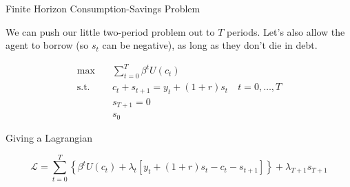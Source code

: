 \documentclass[11pt, xcolor={dvipsnames}, hyperref={colorlinks, allcolors=Blue}]{beamer}
\begin{document}
\begin{frame}{Finite Horizon Consumption-Savings Problem}

We can push our little two-period problem out to $T$ periods. Let's also allow the agent to borrow (so $s_{t}$ can be negative), as long as they don't die in debt.


\begin{align*}
\max \quad & \sum_{t=0}^{T} \beta^{t} U(c_{t})\\
\text{s.t.} \quad & c_{t} + s_{t+1} = y_{t} + (1+r)s_{t} \quad t = 0,\dots, T\\
& s_{T+1} = 0\\
&s_{0}
\end{align*}

Giving a Lagrangian

\[\mathcal{L} = \sum_{t=0}^{T}\left \{ \beta^{t}U(c_{t}) + \lambda_{t}[y_{t} + (1+r)s_{t} - c_{t} - s_{t+1}] \right\} + \lambda_{T+1}s_{T+1}\]


\end{frame}
\end{document}
